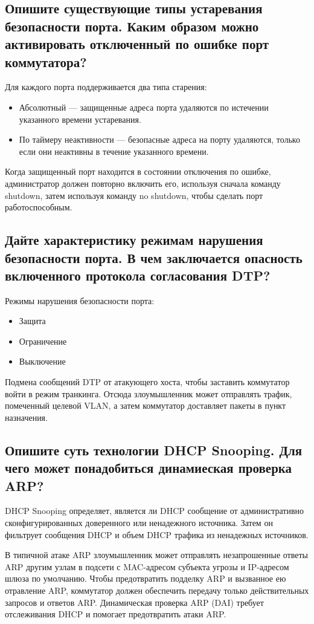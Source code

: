 \subsection{Опишите существующие типы устаревания безопасности порта.
Каким образом можно активировать отключенный по ошибке
порт коммутатора?}

Для каждого порта поддерживается два типа старения:

\begin{itemize}
    \item Абсолютный --- защищенные адреса порта удаляются по истечении
    указанного времени устаревания.
    \item По таймеру неактивности --- безопасные адреса на порту
    удаляются, только если они неактивны в течение указанного
    времени.
\end{itemize}

Когда защищенный порт находится в состоянии отключения по
ошибке, администратор должен повторно включить его, используя сначала
команду shutdown, затем используя команду no shutdown, чтобы сделать
порт работоспособным.

\subsection{Дайте характеристику режимам нарушения безопасности порта.
В чем заключается опасность включенного протокола
согласования DTP?}

Режимы нарушения безопасности порта:

\begin{itemize}
    \item Защита
    \item Ограничение
    \item Выключение
\end{itemize}

Подмена сообщений DTP от атакующего хоста, чтобы заставить
коммутатор войти в режим транкинга. Отсюда злоумышленник может
отправлять трафик, помеченный целевой VLAN, а затем коммутатор
доставляет пакеты в пункт назначения.

\subsection{Опишите суть технологии DHCP Snooping. Для чего может
понадобиться динамиеская проверка ARP?}

DHCP Snooping определяет, является ли DHCP сообщение от
административно сконфигурированных доверенного или ненадежного
источника. Затем он фильтрует сообщения DHCP и объем DHCP трафика из
ненадежных источников.\par
В типичной атаке ARP злоумышленник может отправлять
незапрошенные ответы ARP другим узлам в подсети с MAC-адресом
субъекта угрозы и IP-адресом шлюза по умолчанию. Чтобы предотвратить
подделку ARP и вызванное ею отравление ARP, коммутатор должен
обеспечить передачу только действительных запросов и ответов ARP.
Динамическая проверка ARP (DAI) требует отслеживания DHCP и
помогает предотвратить атаки ARP.

